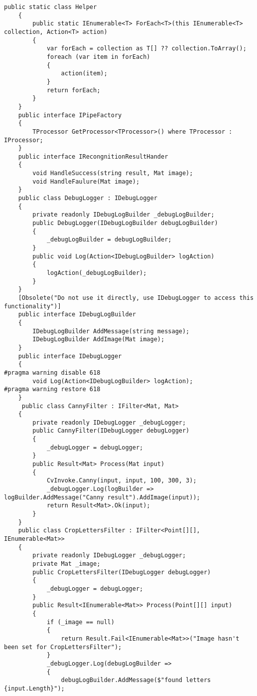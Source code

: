 \begin{lstlisting}[style=fsharpstyle,caption={Исходный код}, label=lst:recognition_result_handler]
    public static class Helper
    {
        public static IEnumerable<T> ForEach<T>(this IEnumerable<T> collection, Action<T> action)
        {
            var forEach = collection as T[] ?? collection.ToArray();
            foreach (var item in forEach)
            {
                action(item);
            }
            return forEach;
        } 
    }
    public interface IPipeFactory
    {
        TProcessor GetProcessor<TProcessor>() where TProcessor : IProcessor;
    }
    public interface IRecongnitionResultHander
    {
        void HandleSuccess(string result, Mat image);
        void HandleFaulure(Mat image);
    }
    public class DebugLogger : IDebugLogger
    {
        private readonly IDebugLogBuilder _debugLogBuilder;
        public DebugLogger(IDebugLogBuilder debugLogBuilder)
        {
            _debugLogBuilder = debugLogBuilder;
        }
        public void Log(Action<IDebugLogBuilder> logAction)
        {
            logAction(_debugLogBuilder);
        }
    }
    [Obsolete("Do not use it directly, use IDebugLogger to access this functionality")]
    public interface IDebugLogBuilder
    {
        IDebugLogBuilder AddMessage(string message);
        IDebugLogBuilder AddImage(Mat image);
    }
    public interface IDebugLogger
    {
#pragma warning disable 618
        void Log(Action<IDebugLogBuilder> logAction);
#pragma warning restore 618
    }
     public class CannyFilter : IFilter<Mat, Mat>
    {
        private readonly IDebugLogger _debugLogger;
        public CannyFilter(IDebugLogger debugLogger)
        {
            _debugLogger = debugLogger;
        }
        public Result<Mat> Process(Mat input)
        {
            CvInvoke.Canny(input, input, 100, 300, 3);
            _debugLogger.Log(logBuilder => logBuilder.AddMessage("Canny result").AddImage(input));
            return Result<Mat>.Ok(input);
        }
    }
    public class CropLettersFilter : IFilter<Point[][], IEnumerable<Mat>>
    {
        private readonly IDebugLogger _debugLogger;
        private Mat _image;
        public CropLettersFilter(IDebugLogger debugLogger)
        {
            _debugLogger = debugLogger;
        }
        public Result<IEnumerable<Mat>> Process(Point[][] input)
        {
            if (_image == null)
            {
                return Result.Fail<IEnumerable<Mat>>("Image hasn't been set for CropLettersFilter");
            }
            _debugLogger.Log(debugLogBuilder =>
            {
                debugLogBuilder.AddMessage($"found letters {input.Length}");

\end{lstlisting}
